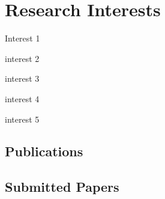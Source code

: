 \documentclass[11pt]{article}
\begin{document}


\section*{Research Interests}

\hspace{-.25em}\begin{itemize*}[itemjoin={{; }}, label={}]
\item Interest 1
\item interest 2
\item interest 3
\item interest 4
\item interest 5
\end{itemize*}



\begin{refsection}
\section*{Publications}
\nocite{*}                          %
\printbibliography[heading = none,  %
keyword = article,                  %
env = mybib]                        %
\end{refsection}


\begin{refsection}
\section*{Submitted Papers}
\nocite{*}
\printbibliography[heading = none, keyword = submitted, env = mybib]
\end{refsection}
\end{document}

